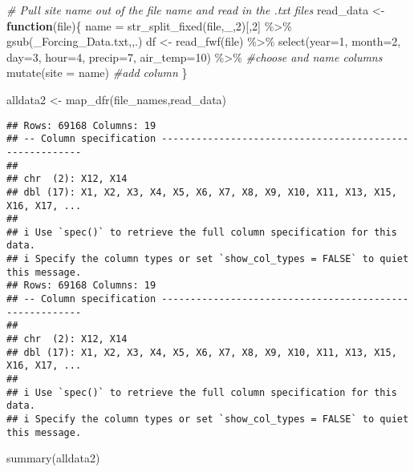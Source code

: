 \documentclass[
]{book}
\newenvironment{Shaded}{\begin{snugshade}}{\end{snugshade}}
\newcommand{\AttributeTok}[1]{\textcolor[rgb]{0.77,0.63,0.00}{#1}}
\newcommand{\CommentTok}[1]{\textcolor[rgb]{0.56,0.35,0.01}{\textit{#1}}}
\newcommand{\ControlFlowTok}[1]{\textcolor[rgb]{0.13,0.29,0.53}{\textbf{#1}}}
\newcommand{\DecValTok}[1]{\textcolor[rgb]{0.00,0.00,0.81}{#1}}
\newcommand{\FunctionTok}[1]{\textcolor[rgb]{0.00,0.00,0.00}{#1}}
\newcommand{\NormalTok}[1]{#1}
\newcommand{\OtherTok}[1]{\textcolor[rgb]{0.56,0.35,0.01}{#1}}
\newcommand{\SpecialCharTok}[1]{\textcolor[rgb]{0.00,0.00,0.00}{#1}}
\newcommand{\StringTok}[1]{\textcolor[rgb]{0.31,0.60,0.02}{#1}}
\begin{document}
\begin{Shaded}
\begin{Highlighting}[]
\CommentTok{\# Pull site name out of the file name and read in the .txt files}
\NormalTok{read\_data }\OtherTok{\textless{}{-}} \ControlFlowTok{function}\NormalTok{(file)\{}
\NormalTok{  name }\OtherTok{=} \FunctionTok{str\_split\_fixed}\NormalTok{(file,}\StringTok{\textquotesingle{}\_\textquotesingle{}}\NormalTok{,}\DecValTok{2}\NormalTok{)[,}\DecValTok{2}\NormalTok{] }\SpecialCharTok{\%\textgreater{}\%} 
    \FunctionTok{gsub}\NormalTok{(}\StringTok{\textquotesingle{}\_Forcing\_Data.txt\textquotesingle{}}\NormalTok{,}\StringTok{\textquotesingle{}\textquotesingle{}}\NormalTok{,.) }
\NormalTok{  df }\OtherTok{\textless{}{-}} \FunctionTok{read\_fwf}\NormalTok{(file) }\SpecialCharTok{\%\textgreater{}\%} 
    \FunctionTok{select}\NormalTok{(}\AttributeTok{year=}\DecValTok{1}\NormalTok{, }\AttributeTok{month=}\DecValTok{2}\NormalTok{, }\AttributeTok{day=}\DecValTok{3}\NormalTok{, }\AttributeTok{hour=}\DecValTok{4}\NormalTok{, }\AttributeTok{precip=}\DecValTok{7}\NormalTok{, }\AttributeTok{air\_temp=}\DecValTok{10}\NormalTok{) }\SpecialCharTok{\%\textgreater{}\%} \CommentTok{\#choose and name columns}
    \FunctionTok{mutate}\NormalTok{(}\AttributeTok{site =}\NormalTok{ name) }\CommentTok{\#add column }
\NormalTok{\}}

\NormalTok{alldata2 }\OtherTok{\textless{}{-}} \FunctionTok{map\_dfr}\NormalTok{(file\_names,read\_data) }
\end{Highlighting}
\end{Shaded}

\begin{verbatim}
## Rows: 69168 Columns: 19
## -- Column specification --------------------------------------------------------
## 
## chr  (2): X12, X14
## dbl (17): X1, X2, X3, X4, X5, X6, X7, X8, X9, X10, X11, X13, X15, X16, X17, ...
## 
## i Use `spec()` to retrieve the full column specification for this data.
## i Specify the column types or set `show_col_types = FALSE` to quiet this message.
## Rows: 69168 Columns: 19
## -- Column specification --------------------------------------------------------
## 
## chr  (2): X12, X14
## dbl (17): X1, X2, X3, X4, X5, X6, X7, X8, X9, X10, X11, X13, X15, X16, X17, ...
## 
## i Use `spec()` to retrieve the full column specification for this data.
## i Specify the column types or set `show_col_types = FALSE` to quiet this message.
\end{verbatim}

\begin{Shaded}
\begin{Highlighting}[]
\FunctionTok{summary}\NormalTok{(alldata2)}
\end{Highlighting}
\end{Shaded}
\end{document}
